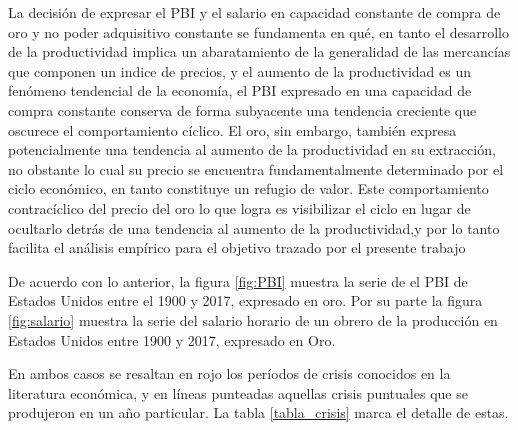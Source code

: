 \documentclass[a4paper]{article}
\begin{document}
La decisión de expresar el PBI y el salario en capacidad constante de compra de oro y no poder adquisitivo constante se fundamenta en qué, en tanto el desarrollo de la productividad implica un abaratamiento de la generalidad de las mercancías que componen un indice de precios, y el aumento de la productividad es un fenómeno tendencial de la economía, el PBI expresado en una capacidad de compra constante conserva de forma subyacente una tendencia creciente que oscurece el comportamiento cíclico. El oro, sin embargo, también expresa potencialmente una tendencia al aumento de la productividad en su extracción, no obstante lo cual su precio se encuentra fundamentalmente determinado por el ciclo económico, en tanto constituye un refugio de valor. Este comportamiento contracíclico del precio del oro lo que logra es visibilizar el ciclo en lugar de ocultarlo detrás de una tendencia al aumento de la productividad,y por lo tanto facilita el análisis empírico para el objetivo trazado por el presente trabajo

De acuerdo con lo anterior, la figura \ref{fig:PBI} muestra la serie de el PBI de Estados Unidos entre el 1900 y 2017, expresado en oro. Por su parte la figura \ref{fig:salario} muestra la serie del salario horario de un obrero de la producción en Estados Unidos entre 1900 y 2017, expresado en Oro.

 En ambos casos se resaltan en rojo los períodos de crisis conocidos en la literatura económica, y en líneas punteadas aquellas crisis puntuales que se produjeron en un año particular. La tabla \ref{tabla_crisis} marca el detalle de estas.
\end{document}

